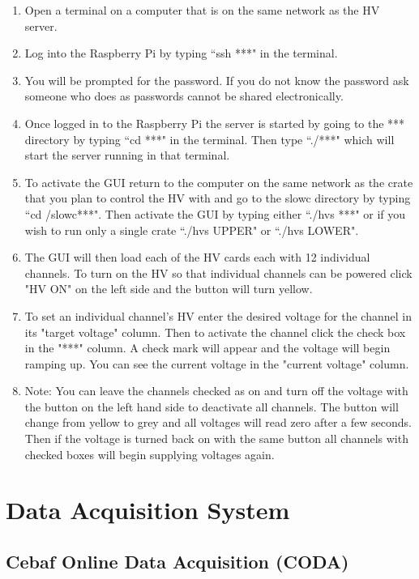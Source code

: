\documentclass[oneside]{book}   %
\begin{document}
\begin{enumerate}
	\item Open a terminal on a computer that is on the same network as the HV server.
	\item Log into the Raspberry Pi by typing ``ssh ***" in the terminal.
	\item You will be prompted for the password. If you do not know the password ask someone who does as passwords cannot be shared electronically. 
	\item Once logged in to the Raspberry Pi the server is started by going to the *** directory by typing ``cd ***" in the terminal. Then type ``./***" which will start the server running in that terminal.
	\item To activate the GUI return to the computer on the same network as the crate that you plan to control the HV with and go to the slowc directory by typing ``cd /slowc***". Then activate the GUI by typing either ``./hvs ***" or if you wish to run only a single crate ``./hvs UPPER" or ``./hvs LOWER".
	\item The GUI will then load each of the HV cards each with 12 individual channels. To turn on the HV so that individual channels can be powered click "HV ON" on the left side and the button will turn yellow.
	\item To set an individual channel's HV enter the desired voltage for the channel in its "target voltage" column. Then to activate the channel click the check box in the "***" column. A check mark will appear and the voltage will begin ramping up. You can see the current voltage in the "current voltage" column.
	\item Note: You can leave the channels checked as on and turn off the voltage with the button on the left hand side to deactivate all channels. The button will change from yellow to grey and all voltages will read zero after a few seconds. Then if the voltage is turned back on with the same button all channels with checked boxes will begin supplying voltages again. 
\end{enumerate}


\chapter{Data Acquisition System}
\label{ch:daq}

\section{Cebaf Online Data Acquisition (CODA)}
\label{sec:coda}
\end{document}
